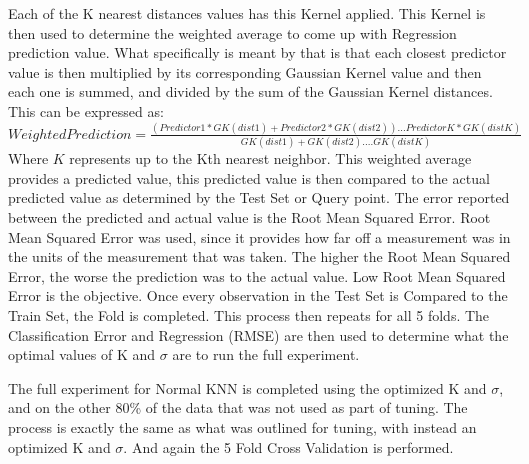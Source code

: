 \documentclass[twoside,11pt]{article}
\begin{document}
Each of the K nearest distances values has this Kernel applied. This Kernel is then used to determine the weighted average to come up with Regression prediction value. What specifically is meant by that is that each closest predictor value is then multiplied by its corresponding Gaussian Kernel value and then each one is summed, and divided by the sum of the Gaussian Kernel distances. 
This can be expressed as:\newline
$Weighted Prediction = \frac{(Predictor1*GK(dist1) + Predictor2*GK(dist2))...PredictorK*GK(distK)}{GK(dist1) + GK(dist2)....GK(distK)}$\newline
\newline
Where $K$ represents up to the Kth nearest neighbor. This weighted average provides a predicted value, this predicted value is then compared to the actual predicted value as determined by the Test Set or Query point. The error reported between the predicted and actual value is the Root Mean Squared Error. Root Mean Squared Error was used, since it provides how far off a measurement was in the units of the measurement that was taken. The higher the Root Mean Squared Error, the worse the prediction was to the actual value. Low Root Mean Squared Error is the objective.\newline
Once every observation in the Test Set is Compared to the Train Set, the Fold is completed. 
This process then repeats for all 5 folds. The Classification Error and Regression (RMSE) are then used to determine what the optimal values of K and $\sigma$ are to run the full experiment.\newline

The full experiment for Normal KNN is completed using the optimized K and $\sigma$, and on the other 80\% of the data that was not used as part of tuning. The process is exactly the same as what was outlined for tuning, with instead an optimized K and $\sigma$. And again the 5 Fold Cross Validation is performed.\newline 
\end{document}
